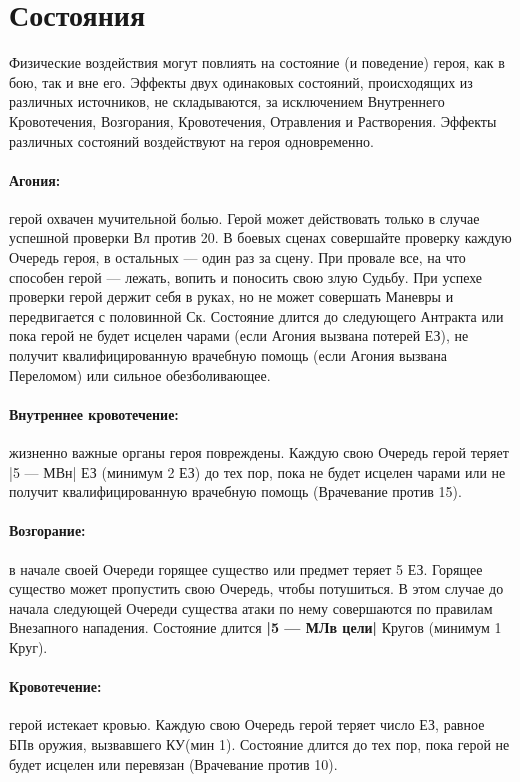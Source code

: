 \section{Состояния}
Физические  воздействия могут повлиять на состояние (и поведение) героя, как в бою, так и вне его. Эффекты двух
одинаковых состояний, происходящих из различных источников, не складываются, за исключением Внутреннего Кровотечения, Возгорания, Кровотечения, Отравления и Растворения. Эффекты различных состояний воздействуют на героя одновременно.
\paragraph{Агония:} герой охвачен мучительной болью. Герой может действовать только в случае успешной проверки Вл против 20. В боевых сценах совершайте проверку каждую Очередь героя, в остальных — один раз за сцену. При провале все, на что способен герой — лежать, вопить и поносить свою злую Судьбу. При успехе проверки герой держит себя в руках, но не может совершать Маневры и передвигается с половинной Ск. Состояние длится до следующего Антракта или пока герой не будет исцелен чарами (если Агония вызвана потерей ЕЗ), не получит квалифицированную врачебную помощь (если Агония вызвана Переломом) или сильное обезболивающее.
\paragraph{Внутреннее кровотечение:} жизненно важные органы героя повреждены. Каждую свою Очередь герой теряет |5 — МВн| ЕЗ (минимум 2 ЕЗ) до тех пор, пока не будет исцелен чарами или не получит квалифицированную врачебную помощь (Врачевание против 15).
\paragraph{Возгорание:} в начале своей Очереди горящее существо или предмет теряет 5 ЕЗ. Горящее существо может пропустить свою Очередь, чтобы потушиться. В этом случае до начала следующей Очереди существа атаки по нему совершаются по правилам Внезапного нападения. Состояние длится \textbf{|5 — МЛв цели|} Кругов (минимум 1 Круг).
\paragraph{Кровотечение:} герой истекает кровью. Каждую свою Очередь герой теряет число ЕЗ, равное БПв оружия, вызвавшего КУ(мин 1). Состояние длится до тех пор, пока герой не будет исцелен или перевязан (Врачевание против 10).
